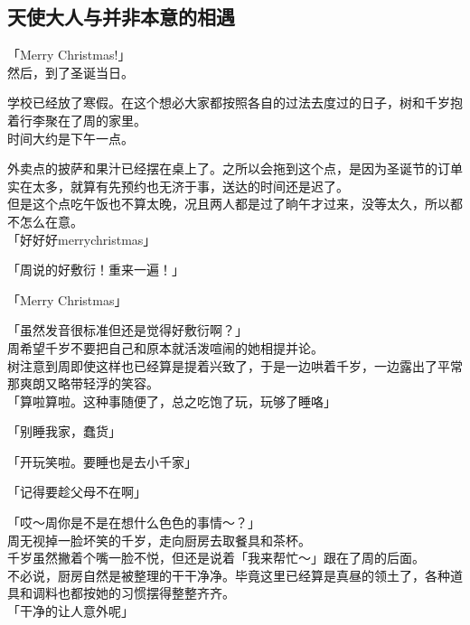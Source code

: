 \subsection{天使大人与并非本意的相遇}

「Merry Christmas!」\\

然后，到了圣诞当日。

学校已经放了寒假。在这个想必大家都按照各自的过法去度过的日子，树和千岁抱着行李聚在了周的家里。\\

时间大约是下午一点。

外卖点的披萨和果汁已经摆在桌上了。之所以会拖到这个点，是因为圣诞节的订单实在太多，就算有先预约也无济于事，送达的时间还是迟了。\\

但是这个点吃午饭也不算太晚，况且两人都是过了晌午才过来，没等太久，所以都不怎么在意。\\

「好好好merrychristmas」

「周说的好敷衍！重来一遍！」

「Merry Christmas」

「虽然发音很标准但还是觉得好敷衍啊？」\\

周希望千岁不要把自己和原本就活泼喧闹的她相提并论。\\

树注意到周即使这样也已经算是提着兴致了，于是一边哄着千岁，一边露出了平常那爽朗又略带轻浮的笑容。\\

「算啦算啦。这种事随便了，总之吃饱了玩，玩够了睡咯」

「别睡我家，蠢货」

「开玩笑啦。要睡也是去小千家」

「记得要趁父母不在啊」

「哎～周你是不是在想什么色色的事情～？」\\

周无视掉一脸坏笑的千岁，走向厨房去取餐具和茶杯。\\

千岁虽然撇着个嘴一脸不悦，但还是说着「我来帮忙～」跟在了周的后面。\\

不必说，厨房自然是被整理的干干净净。毕竟这里已经算是真昼的领土了，各种道具和调料也都按她的习惯摆得整整齐齐。\\

「干净的让人意外呢」

